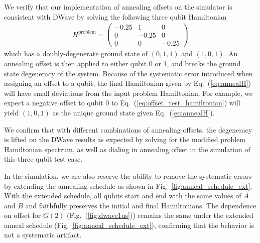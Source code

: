 \documentclass[prd,twocolumn,tightenlines,preprintnumbers,showpacs,superscriptaddress,notitlepage,nofootinbib,eqsecnum,floatfix,longbibliography,aps,10pt]{revtex4-2}
\begin{document}
We verify that our implementation of annealing offsets on the simulator is consistent with DWave by solving the following three qubit Hamiltonian
\begin{align}
	\label{eq:offset_test_hamiltonian}
	H^{\textrm{problem}} =
	\begin{pmatrix}
		-0.25 & 1 & 0 \\
		0 & -0.25 & 0 \\
		0 & 0 & -0.25
	\end{pmatrix}
\end{align}
which has a doubly-degenerate ground state of $(0, 1, 1)$ and $(1, 0, 1)$. An annealing offset is then applied to either qubit 0 or 1, and breaks the ground state degeneracy of the system. Because of the systematic error introduced when assigning an offset to a qubit, the final Hamiltonian given by Eq.~(\ref{eq:annealH}) will have small deviations from the input problem Hamiltonian. For example, we expect a negative offset to qubit 0 to Eq.~(\ref{eq:offset_test_hamiltonian}) will yield $(1, 0, 1)$ as the unique ground state given Eq.~(\ref{eq:annealH}).

We confirm that with different combinations of annealing offsets, the degeneracy is lifted on the DWave results as expected by solving for the modified problem Hamiltonian spectrum, as well as dialing in annealing offset in the simulation of this three qubit test case.

In the simulation, we are also reserve the ability to remove the systematic errors by extending the annealing schedule as shown in Fig.~\ref{fig:anneal_schedule_ext}. With the extended schedule, all qubits start and end with the same values of $A$ and $B$ and faithfully preserves the initial and final Hamiltonians. The dependence on offset for $G(2)$ (Fig.~(\ref{fig:dwave1us})) remains the same under the extended anneal schedule (Fig.~\ref{fig:anneal_schedule_ext}), confirming that the behavior is not a systematic artifact.
\end{document}
